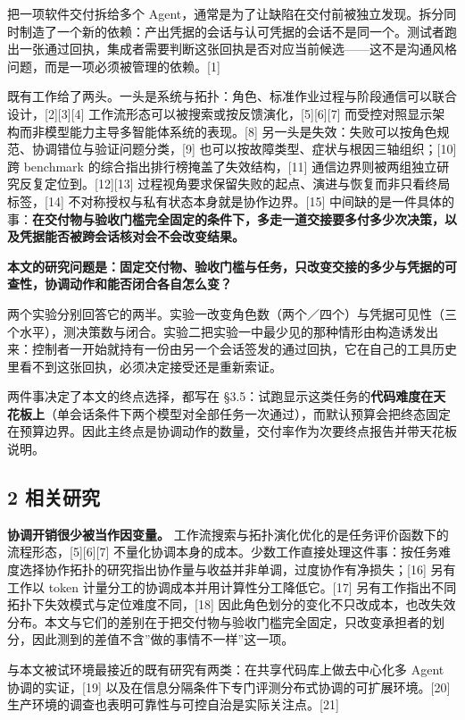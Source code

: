\documentclass[
]{article}
\begin{document}
把一项软件交付拆给多个
Agent，通常是为了让缺陷在交付前被独立发现。拆分同时制造了一个新的依赖：产出凭据的会话与认可凭据的会话不是同一个。测试者跑出一张通过回执，集成者需要判断这张回执是否对应当前候选------这不是沟通风格问题，而是一项必须被管理的依赖。{[}1{]}

既有工作给了两头。一头是系统与拓扑：角色、标准作业过程与阶段通信可以联合设计，{[}2{]}{[}3{]}{[}4{]}
工作流形态可以被搜索或按反馈演化，{[}5{]}{[}6{]}{[}7{]}
而受控对照显示架构而非模型能力主导多智能体系统的表现。{[}8{]}
另一头是失效：失败可以按角色规范、协调错位与验证问题分类，{[}9{]}
也可以按故障类型、症状与根因三轴组织；{[}10{]} 跨 benchmark
的综合指出排行榜掩盖了失效结构，{[}11{]}
通信边界则被两组独立研究反复定位到。{[}12{]}{[}13{]}
过程视角要求保留失败的起点、演进与恢复而非只看终局标签，{[}14{]}
不对称授权与私有状态本身就是协作边界。{[}15{]}
中间缺的是一件具体的事：\textbf{在交付物与验收门槛完全固定的条件下，多走一道交接要多付多少次决策，以及凭据能否被跨会话核对会不会改变结果。}

\textbf{本文的研究问题是：固定交付物、验收门槛与任务，只改变交接的多少与凭据的可查性，协调动作和能否闭合各自怎么变？}

两个实验分别回答它的两半。实验一改变角色数（两个／四个）与凭据可见性（三个水平），测决策数与闭合。实验二把实验一中最少见的那种情形由构造诱发出来：控制者一开始就持有一份由另一个会话签发的通过回执，它在自己的工具历史里看不到这张回执，必须决定接受还是重新索证。

两件事决定了本文的终点选择，都写在
§3.5：试跑显示这类任务的\textbf{代码难度在天花板上}（单会话条件下两个模型对全部任务一次通过），而默认预算会把终态固定在预算边界。因此主终点是协调动作的数量，交付率作为次要终点报告并带天花板说明。

\subsection{2 相关研究}\label{ux76f8ux5173ux7814ux7a76}

\textbf{协调开销很少被当作因变量。}
工作流搜索与拓扑演化优化的是任务评价函数下的流程形态，{[}5{]}{[}6{]}{[}7{]}
不量化协调本身的成本。少数工作直接处理这件事：按任务难度选择协作拓扑的研究指出协作量与收益并非单调，过度协作有净损失；{[}16{]}
另有工作以 token 计量分工的协调成本并用计算性分工降低它。{[}17{]}
另有工作指出不同拓扑下失效模式与定位难度不同，{[}18{]}
因此角色划分的变化不只改成本，也改失效分布。本文与它们的差别在于把交付物与验收门槛完全固定，只改变承担者的划分，因此测到的差值不含''做的事情不一样''这一项。

与本文被试环境最接近的既有研究有两类：在共享代码库上做去中心化多 Agent
协调的实证，{[}19{]}
以及在信息分隔条件下专门评测分布式协调的可扩展环境。{[}20{]}
生产环境的调查也表明可靠性与可控自治是实际关注点。{[}21{]}
\end{document}
